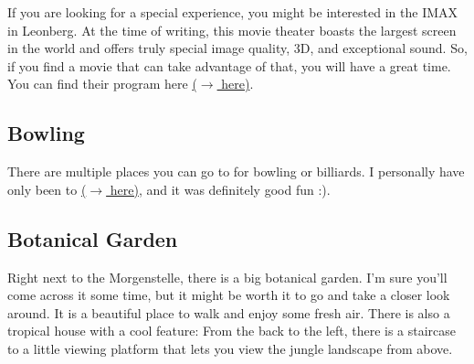 If you are looking for a special experience, you might be interested in the IMAX in Leonberg. At the time of writing, this movie theater boasts the largest screen in the world and offers truly special image quality, 3D, and exceptional sound. So, if you find a movie that can take advantage of that, you will have a great time. You can find their program here \href{https://imax.traumpalast.de/index.php/PID/11295.html}{($\xrightarrow{}$ here)}.

\subsection{Bowling}
There are multiple places you can go to for bowling or billiards. I personally have only been to  \href{https://maps.app.goo.gl/dgMVABnYTJC7qGBT8}{($\xrightarrow{}$ here)}, and it was definitely good fun :).  

\subsection{Botanical Garden}
Right next to the Morgenstelle, there is a big botanical garden. I'm sure you'll come across it some time, but it might be worth it to go and take a closer look around. It is a beautiful place to walk and enjoy some fresh air. There is also a tropical house with a cool feature: From the back to the left, there is a staircase to a little viewing platform that lets you view the jungle landscape from above.